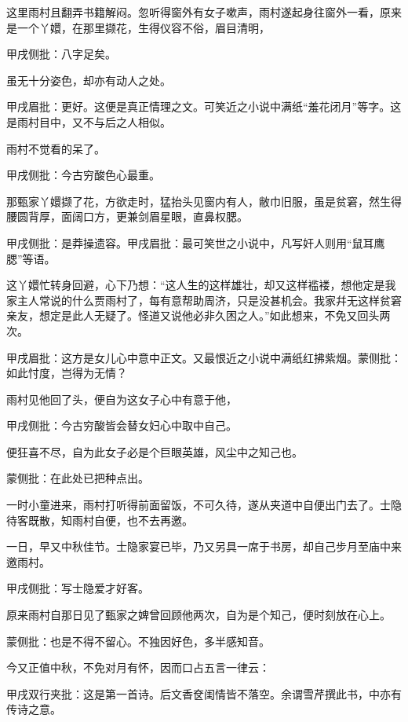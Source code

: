 \begin{parag}
    这里雨村且翻弄书籍解闷。忽听得窗外有女子嗽声，雨村遂起身往窗外一看，原来是一个丫嬛，在那里撷花，生得仪容不俗，眉目清明，\begin{note}甲戌侧批：八字足矣。\end{note}虽无十分姿色，却亦有动人之处。\begin{note}甲戌眉批：更好。这便是真正情理之文。可笑近之小说中满纸“羞花闭月”等字。这是雨村目中，又不与后之人相似。\end{note}雨村不觉看的呆了。\begin{note}甲戌侧批：今古穷酸色心最重。\end{note}那甄家丫嬛撷了花，方欲走时，猛抬头见窗内有人，敝巾旧服，虽是贫窘，然生得腰圆背厚，面阔口方，更兼剑眉星眼，直鼻权腮。\begin{note}甲戌侧批：是莽操遗容。甲戌眉批：最可笑世之小说中，凡写奸人则用“鼠耳鹰腮”等语。\end{note}这丫嬛忙转身回避，心下乃想：“这人生的这样雄壮，却又这样褴褛，想他定是我家主人常说的什么贾雨村了，每有意帮助周济，只是没甚机会。我家幷无这样贫窘亲友，想定是此人无疑了。怪道又说他必非久困之人。”如此想来，不免又回头两次。\begin{note}甲戌眉批：这方是女儿心中意中正文。又最恨近之小说中满纸红拂紫烟。蒙侧批：如此忖度，岂得为无情？\end{note}雨村见他回了头，便自为这女子心中有意于他，\begin{note}甲戌侧批：今古穷酸皆会替女妇心中取中自己。\end{note}便狂喜不尽，自为此女子必是个巨眼英雄，风尘中之知己也。\begin{note}蒙侧批：在此处已把种点出。\end{note}一时小童进来，雨村打听得前面留饭，不可久待，遂从夹道中自便出门去了。士隐待客既散，知雨村自便，也不去再邀。
\end{parag}


\begin{parag}
    一日，早又中秋佳节。士隐家宴已毕，乃又另具一席于书房，却自己步月至庙中来邀雨村。\begin{note}甲戌侧批：写士隐爱才好客。\end{note}原来雨村自那日见了甄家之婢曾回顾他两次，自为是个知己，便时刻放在心上。\begin{note}蒙侧批：也是不得不留心。不独因好色，多半感知音。\end{note}今又正值中秋，不免对月有怀，因而口占五言一律云：\begin{note}甲戌双行夹批：这是第一首诗。后文香奁闺情皆不落空。余谓雪芹撰此书，中亦有传诗之意。\end{note}
\end{parag}


